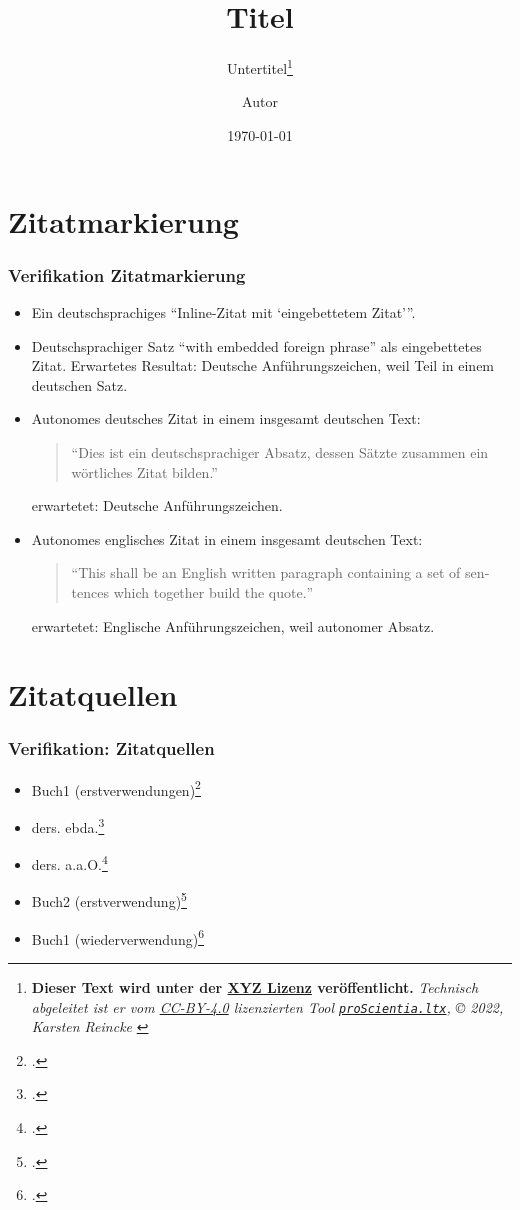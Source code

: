 \documentclass[]{beamer}
\title{Titel}
\subtitle{Untertitel\footnote{\tiny{
  \textbf{Dieser Text wird unter der \href{https://creativecommons.org/}{XYZ Lizenz} veröffentlicht.}
\textit{\textrm{Technisch abgeleitet ist er vom \href{https://creativecommons.org/licenses/by/4.0/}{CC-BY-4.0} lizenzierten Tool \texttt{\href{https://github.com/kreincke/proScientia.ltx}{proScientia.ltx}}, \copyright{} 2022, Karsten Reincke}}
  }}}
\institute{Institute}
\author{Autor}
\date{\today}
\begin{document}
\begin{frame}
  \titlepage
\end{frame}

\section{Zitatmarkierung}

\begin{frame}
  \frametitle{Verifikation Zitatmarkierung}
  \begin{itemize}

    \item Ein deutschsprachiges \enquote{Inline-Zitat mit \enquote{eingebettetem Zitat}}.
  
    \item Deutschsprachiger Satz \foreignquote{german}{with embedded foreign phrase}
    als eingebettetes Zitat. Erwartetes Resultat: Deutsche Anführungszeichen,
    weil Teil in einem deutschen Satz.

    \item Autonomes deutsches Zitat in einem insgesamt deutschen Text:
    \newline \newline
    \begin{quote}
      \textrm{\enquote{Dies ist ein deutschsprachiger Absatz, dessen Sätzte zusammen
      ein wörtliches Zitat bilden.}}
    \end{quote}
    erwartetet: Deutsche Anführungszeichen.
  
    \item Autonomes englisches Zitat in einem insgesamt deutschen Text:
    \newline \newline
    \begin{quote}
      \textrm{\foreignquote{english}{This shall be an English written paragraph containing
      a set of sentences which together build the quote.}}
    \end{quote}
    erwartetet: Englische Anführungszeichen, weil autonomer Absatz.
  \end{itemize}

\end{frame}

\section{Zitatquellen}
\begin{frame}
  \frametitle{Verifikation: Zitatquellen}
  \begin{itemize}
    \item Buch1 (erstverwendungen)\footcite[vgl.][15]{KantKdrV1974}
    \item ders. ebda.\footcite[vgl.][15]{KantKdrV1974}
    \item ders. a.a.O.\footcite[vgl.][23]{KantKdrV1974}
    \item Buch2 (erstverwendung)\footcite[vgl.][15]{KantKdU1974}
    \item Buch1 (wiederverwendung)\footcite[vgl.][15]{KantKdrV1974}
  \end{itemize}

\end{frame}
\end{document}
